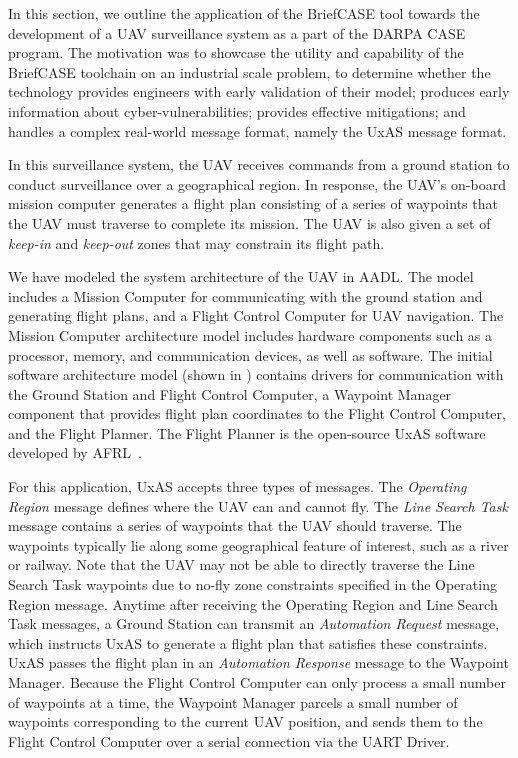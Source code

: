 In this section, we outline the application of the BriefCASE tool towards the development of a UAV surveillance system as a part of the DARPA CASE program.
The motivation was to showcase the utility and capability of the BriefCASE toolchain on an industrial scale problem, to determine whether the technology provides engineers with early validation of their model; produces early information about cyber-vulnerabilities; provides effective mitigations; and handles a complex real-world message format, namely  the UxAS message format.

In this surveillance system, the UAV receives commands from a ground station to conduct surveillance over a geographical region. In response, the UAV's on-board mission computer generates a flight plan consisting of a series of waypoints that the UAV must traverse to complete its mission. The UAV is also given a set of \textit{keep-in} and \textit{keep-out} zones that may constrain its flight path.

We have modeled the system architecture of the UAV in AADL.  The model includes a Mission Computer for communicating with the ground station and generating flight plans, and a Flight Control Computer for UAV navigation.  The Mission Computer architecture model includes hardware components such as a processor, memory, and communication devices, as well as software.
%
The initial software architecture model (shown in ) contains drivers for communication with the Ground Station and Flight Control Computer, a Waypoint Manager component that provides flight plan coordinates to the Flight Control Computer, and the Flight Planner.  The Flight Planner is the open-source UxAS software developed by AFRL~\cite{uxas}.

For this application, UxAS accepts three types of messages.  The \textit{Operating Region} message defines where the UAV can and cannot fly.  The \textit{Line Search Task} message contains a series of waypoints that the UAV should traverse.  The waypoints typically lie along some geographical feature of interest, such as a river or railway.  Note that the UAV may not be able to directly traverse the Line Search Task waypoints due to no-fly zone constraints specified in the Operating Region message.  Anytime after receiving the Operating Region and Line Search Task messages, a Ground Station can transmit an \textit{Automation Request} message, which instructs UxAS to generate a flight plan that satisfies these constraints.  UxAS passes the flight plan in an \textit{Automation Response} message to the Waypoint Manager.  Because the Flight Control Computer can only process a small number of waypoints at a time, the Waypoint Manager parcels a small number of waypoints corresponding to the current UAV position, and sends them to the Flight Control Computer over a serial connection via the UART Driver.

